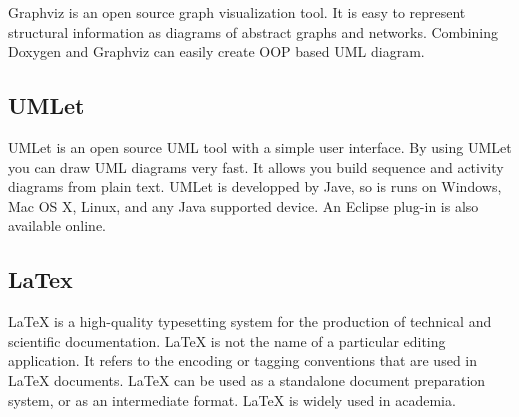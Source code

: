 Graphviz is an open source graph visualization tool. It is easy to represent structural information as diagrams of abstract graphs and networks. Combining Doxygen and Graphviz can easily create O\+O\+P based U\+M\+L diagram. \hypertarget{_development_tools_DevelopmentToolsDocumentationUMLet}{}\subsection{U\+M\+Let}\label{_development_tools_DevelopmentToolsDocumentationUMLet}
U\+M\+Let is an open source U\+M\+L tool with a simple user interface. By using U\+M\+Let you can draw U\+M\+L diagrams very fast. It allows you build sequence and activity diagrams from plain text. U\+M\+Let is developped by Jave, so is runs on Windows, Mac O\+S X, Linux, and any Java supported device. An Eclipse plug-\/in is also available online. \hypertarget{_development_tools_DevelopmentToolsDocumentationLaTex}{}\subsection{La\+Tex}\label{_development_tools_DevelopmentToolsDocumentationLaTex}
La\+Te\+X is a high-\/quality typesetting system for the production of technical and scientific documentation. La\+Te\+X is not the name of a particular editing application. It refers to the encoding or tagging conventions that are used in La\+Te\+X documents. La\+Te\+X can be used as a standalone document preparation system, or as an intermediate format. La\+Te\+X is widely used in academia. \cite{latex} 